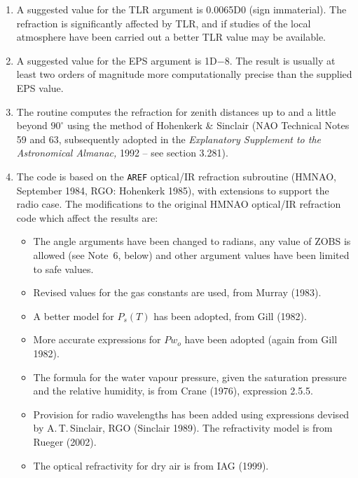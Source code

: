 \documentclass[11pt,twoside,nolof]{starlink}
\begin{document}
{
 \begin{enumerate}
  \item A suggested value for the TLR argument is 0.0065D0 (sign immaterial).
        The refraction is significantly affected by TLR, and if studies
        of the local atmosphere have been carried out a better TLR
        value may be available.
  \item A suggested value for the EPS argument is 1D$-$8.  The result is
        usually at least two orders of magnitude more computationally
        precise than the supplied EPS value.
  \item The routine computes the refraction for zenith distances up
        to and a little beyond $90^\circ$ using the method of Hohenkerk
        \& Sinclair (NAO Technical Notes 59 and 63, subsequently adopted
        in the \textit{Explanatory Supplement to the Astronomical Almanac,}\/
        1992 -- see section 3.281).
 \item The code is based on the \texttt{AREF}
       optical/IR refraction subroutine
       (HMNAO, September 1984, RGO: Hohenkerk 1985),
       with extensions to
       support the radio case.  The modifications to the original HMNAO
       optical/IR refraction code which affect the results are:
       \begin{itemize}
        \item The angle arguments have been changed to radians,
              any value of ZOBS is allowed (see Note~6, below) and
              other argument values have been limited to safe values.
        \item Revised values for the gas constants are used, from
              Murray (1983).
        \item A better model for $P_s(T)$ has been adopted,
              from Gill (1982).
        \item More accurate expressions for $Pw_o$ have been adopted
              (again from Gill 1982).
        \item The formula for the water vapour pressure, given the
              saturation pressure and the relative humidity, is from
              Crane (1976), expression 2.5.5.
        \item Provision for radio wavelengths has been added using
              expressions devised by A.\,T.\,Sinclair, RGO (Sinclair 1989).
              The refractivity model is from Rueger (2002).
        \item The optical refractivity for dry air is from IAG (1999).
       \end{itemize}

\end{enumerate}}
\end{document}
